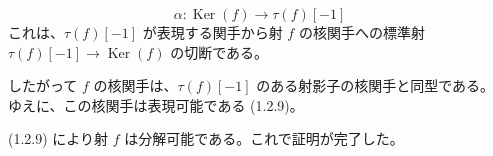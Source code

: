 \[
  \alpha\colon \operatorname{Ker}(f)\longrightarrow \tau(f)[-1]
\]
\noindent これは、$\tau(f)[-1]$ が表現する関手から射 $f$ の核関手への標準射
$\tau(f)[-1]\longrightarrow\operatorname{Ker}(f)$ の切断である。

したがって $f$ の核関手は、$\tau(f)[-1]$ のある射影子の核関手と同型である。
ゆえに、この核関手は表現可能である (1.2.9)。

(1.2.9) により射 $f$ は分解可能である。これで証明が完了した。
\endgroup
